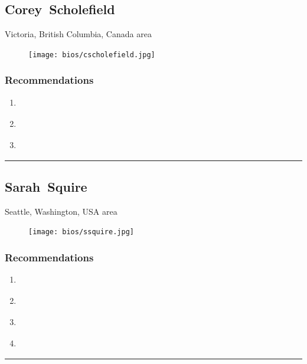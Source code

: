 \subsection{Corey~Scholefield} \textsf{Victoria, British Columbia, Canada area} \par \setlength{\columnsep}{0pt} \begin{figure} \centering \texttt{[image: bios/cscholefield.jpg]} \end{figure}  \subsubsection{Recommendations}\begin{enumerate}
\item \cite{Hazelton2015}
\item \cite{Prasad2012}
\item \cite{Windley2005}
\end{enumerate}\noindent\rule{\textwidth}{0.2pt}

\subsection{Sarah~Squire} \textsf{Seattle, Washington, USA area} \par \setlength{\columnsep}{0pt} \begin{figure} \centering \texttt{[image: bios/ssquire.jpg]} \end{figure}  \subsubsection{Recommendations}\begin{enumerate}
\item \cite{Gilman2017}
\item \cite{Hardt2005}
\item \cite{NSTIC2011}
\item \cite{Richer2017}
\end{enumerate}\noindent\rule{\textwidth}{0.2pt}

